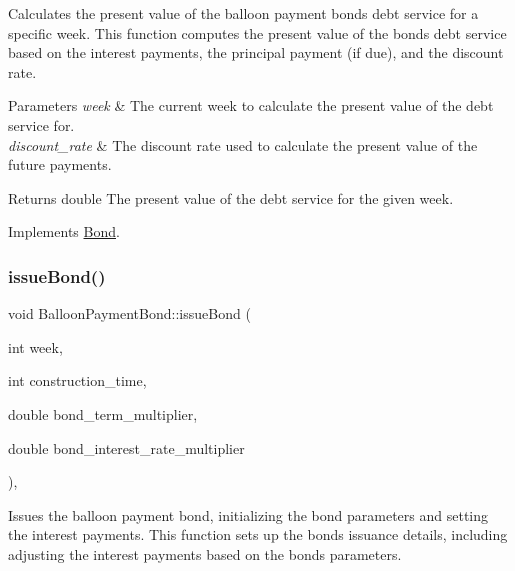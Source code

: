 Calculates the present value of the balloon payment bond\textquotesingle{}s debt service for a specific week. This function computes the present value of the bond\textquotesingle{}s debt service based on the interest payments, the principal payment (if due), and the discount rate. 


\begin{DoxyParams}{Parameters}
{\em week} & The current week to calculate the present value of the debt service for. \\
\hline
{\em discount\+\_\+rate} & The discount rate used to calculate the present value of the future payments.\\
\hline
\end{DoxyParams}
\begin{DoxyReturn}{Returns}
double The present value of the debt service for the given week. 
\end{DoxyReturn}


Implements \mbox{\hyperlink{classBond_a322d4ab0c0c72824ac4df5df80f14d24}{Bond}}.

\mbox{\label{classBalloonPaymentBond_af22552acd74b08dbb1d308cc5e45344c}} 
\subsubsection{\texorpdfstring{issue\+Bond()}{issueBond()}}
{\footnotesize\ttfamily void Balloon\+Payment\+Bond\+::issue\+Bond (\begin{DoxyParamCaption}\item[{int}]{week,  }\item[{int}]{construction\+\_\+time,  }\item[{double}]{bond\+\_\+term\+\_\+multiplier,  }\item[{double}]{bond\+\_\+interest\+\_\+rate\+\_\+multiplier }\end{DoxyParamCaption})\hspace{0.3cm}{\ttfamily [override]}, {\ttfamily [virtual]}}



Issues the balloon payment bond, initializing the bond parameters and setting the interest payments. This function sets up the bond\textquotesingle{}s issuance details, including adjusting the interest payments based on the bond\textquotesingle{}s parameters. 


